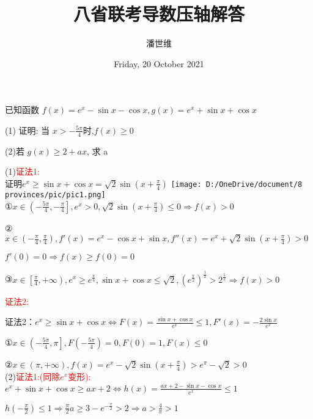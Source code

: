 \documentclass[a4paper,12pt]{article}
\begin{document}
\title {八省联考导数压轴解答}
\author{潘世维}
\date{Friday, 20 October 2021}
\maketitle

已知函数 $ f(x)=e^{x}-\sin x-\cos x, g(x)=e^{x}+\sin x+\cos x$


(1) 证明: 当 $ x>-\frac{5 \pi}{4}  $时,$  f(x) \geq 0 $



(2)若 $ g(x) \geq 2+a x $, 求  a 
\begin{flushleft}

(1)\textcolor{red}{证法1:}\\
证明$e^x \ge \sin x + \cos x = \sqrt 2 \sin \left( x + \frac{\pi }{4} \right) $
\texttt{[image: D:/OneDrive/document/8 provinces/pic/pic1.png]}\\
①$x \in \left( { - \frac{{5\pi }}{4}, - \frac{\pi }{4}} \right],{e^x} > 0,\sqrt 2 \sin \left( {x + \frac{\pi }{4}} \right) \le 0 \Rightarrow f(x) > 0$

②$x \in \left( { - \frac{\pi }{4},\frac{\pi }{4}} \right),f'(x) = {e^x} - \cos x + \sin x,f''(x) = {e^x} + \sqrt 2 \sin \left( {x + \frac{\pi }{4}} \right) > 0$

$  f'(0) = 0 \Rightarrow f(x) \ge f(0) = 0$

③$\left. {x \in \left[ {\frac{\pi }{4}, + \infty } \right.} \right),{e^x} \ge {e^{\frac{\pi }{4}}},\sin x + \cos x \le \sqrt 2 ,{\left( {{e^{\frac{\pi }{2}}}} \right)^{\frac{1}{2}}} > {2^{\frac{1}{2}}} \Rightarrow f(x) > 0$

\textcolor{red}{证法2:}

证法2：$e^x \ge \sin x + \cos x \Leftrightarrow F(x) = \frac{{\sin x + \cos x}}{{{e^x}}} \le 1 ,F'(x) =  - \frac{{2\sin x}}{{{e^x}}}$

①$x \in \left. {\left( { - \frac{{5\pi }}{4},\pi } \right.} \right],F( - \frac{{5\pi }}{4}) = 0,F(0) = 1,F(x) \le 0$

②$\left. {x \in \left( \pi , + \infty  \right.} \right),f(x) = {e^x} - \sqrt 2 \sin (x + \frac{\pi }{4}) > {e^\pi } - \sqrt 2  > 0$
\\(2)\textcolor{red}{证法1:(同除$e^x$变形):}
${e^x} + \sin x + \cos x \ge ax + 2 \Leftrightarrow h(x) = \frac{{ax + 2 - \sin x - \cos x}}{{{e^x}}} \le 1$

$h\left( { - \frac{\pi }{2}} \right) \le 1 \Rightarrow \frac{\pi }{2}a \ge 3 - {e^{ - \frac{\pi }{2}}} > 2 \Rightarrow a > \frac{4}{\pi } >1 $


\end{flushleft}
\end{document}
